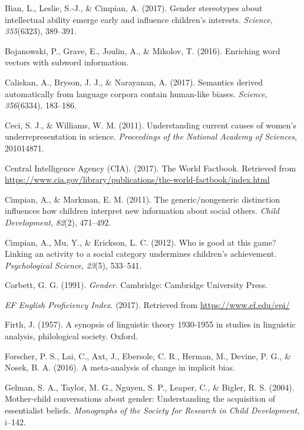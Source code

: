 \documentclass[man,floatsintext]{apa6}
\theoremstyle{definition}
\theoremstyle{definition}
\theoremstyle{definition}
\theoremstyle{remark}
\begin{document}
\hypertarget{refs}{}
\hypertarget{ref-bian2017gender}{}
Bian, L., Leslie, S.-J., \& Cimpian, A. (2017). Gender stereotypes about
intellectual ability emerge early and influence children's interests.
\emph{Science}, \emph{355}(6323), 389--391.

\hypertarget{ref-bojanowski2016enriching}{}
Bojanowski, P., Grave, E., Joulin, A., \& Mikolov, T. (2016). Enriching
word vectors with subword information.

\hypertarget{ref-caliskan2017semantics}{}
Caliskan, A., Bryson, J. J., \& Narayanan, A. (2017). Semantics derived
automatically from language corpora contain human-like biases.
\emph{Science}, \emph{356}(6334), 183--186.

\hypertarget{ref-ceci2011understanding}{}
Ceci, S. J., \& Williams, W. M. (2011). Understanding current causes of
women's underrepresentation in science. \emph{Proceedings of the
National Academy of Sciences}, 201014871.

\hypertarget{ref-ciafactbook}{}
Central Intelligence Agency (CIA). (2017). The World Factbook. Retrieved
from
\url{https://www.cia.gov/library/publications/the-world-factbook/index.html}

\hypertarget{ref-cimpian2011generic}{}
Cimpian, A., \& Markman, E. M. (2011). The generic/nongeneric
distinction influences how children interpret new information about
social others. \emph{Child Development}, \emph{82}(2), 471--492.

\hypertarget{ref-cimpian2012good}{}
Cimpian, A., Mu, Y., \& Erickson, L. C. (2012). Who is good at this
game? Linking an activity to a social category undermines children's
achievement. \emph{Psychological Science}, \emph{23}(5), 533--541.

\hypertarget{ref-corbett1991}{}
Corbett, G. G. (1991). \emph{Gender}. Cambridge: Cambridge University
Press.

\hypertarget{ref-epi}{}
\emph{EF English Proficiency Index}. (2017). Retrieved from
\url{https://www.ef.edu/epi/}

\hypertarget{ref-firth1957synopsis}{}
Firth, J. (1957). A synopsis of linguistic theory 1930-1955 in studies
in linguistic analysis, philological society. Oxford.

\hypertarget{ref-forscher2016meta}{}
Forscher, P. S., Lai, C., Axt, J., Ebersole, C. R., Herman, M., Devine,
P. G., \& Nosek, B. A. (2016). A meta-analysis of change in implicit
bias.

\hypertarget{ref-gelman2004mother}{}
Gelman, S. A., Taylor, M. G., Nguyen, S. P., Leaper, C., \& Bigler, R.
S. (2004). Mother-child conversations about gender: Understanding the
acquisition of essentialist beliefs. \emph{Monographs of the Society for
Research in Child Development}, i--142.
\end{document}
